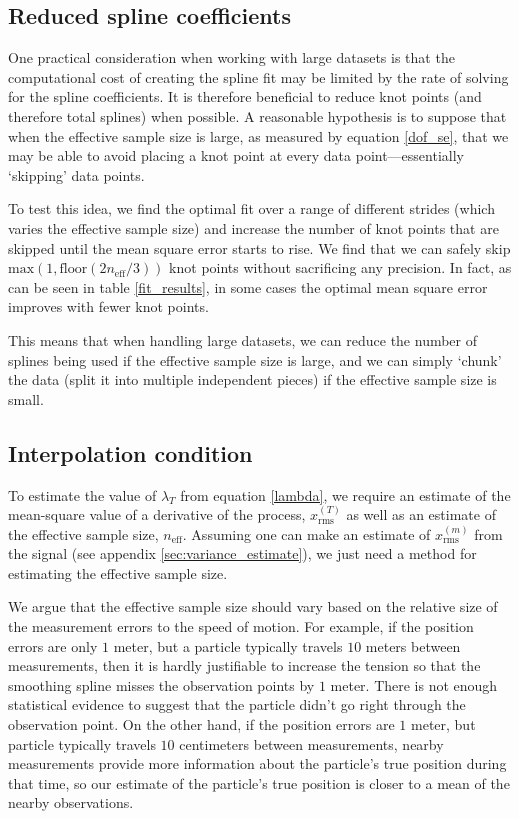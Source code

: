 \documentclass[10pt,journal]{IEEEtran}
\begin{document}
\subsection{Reduced spline coefficients} \label{reduced_coefficients}

One practical consideration when working with large datasets is that the computational cost of creating the spline fit may be limited by the rate of solving for the spline coefficients. It is therefore beneficial to reduce knot points (and therefore total splines) when possible. A reasonable hypothesis is to suppose that when the effective sample size is large, as measured by equation \ref{dof_se}, that we may be able to avoid placing a knot point at every data point---essentially `skipping' data points.

To test this idea, we find the optimal fit over a range of different strides (which varies the effective sample size) and increase the number of knot points that are skipped until the mean square error starts to rise. We find that we can safely skip $\textrm{max}(1,\textrm{floor}(2n_{\textrm{eff}}/3))$ knot points without sacrificing any precision. In fact, as can be seen in table \ref{fit_results}, in some cases the optimal mean square error improves with fewer knot points.

This means that when handling large datasets, we can reduce the number of splines being used if the effective sample size is large, and we can simply `chunk' the data (split it into multiple independent pieces) if the effective sample size is small.

\subsection{Interpolation condition} \label{interpolation_condition}

To estimate the value of $\lambda_T$ from equation \ref{lambda}, we require an estimate of the mean-square value of a derivative of the process, $x_{\textrm{rms}}^{(T)}$ as well as an estimate of the effective sample size, $n_{\textrm{eff}}$. Assuming one can make an estimate of $x_{\textrm{rms}}^{(m)}$ from the signal (see appendix \ref{sec:variance_estimate}), we just need a method for estimating the effective sample size.

We argue that the effective sample size should vary based on the relative size of the measurement errors to the speed of motion. For example, if the position errors are only $1$ meter, but a particle typically travels $10$ meters between measurements, then it is hardly justifiable to increase the tension so that the smoothing spline misses the observation points by $1$ meter. There is not enough statistical evidence to suggest that the particle didn't go right through the observation point. On the other hand, if the position errors are $1$ meter, but particle typically travels $10$ centimeters between measurements, nearby measurements provide more information about the particle's true position during that time, so our estimate of the particle's true position is closer to a mean of the nearby observations.
\end{document}
